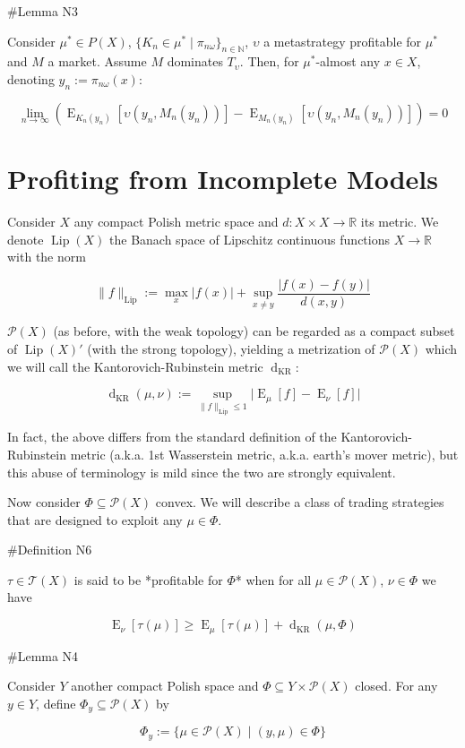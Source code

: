 \documentclass[a4paper]{article}
\DeclareMathOperator{\E}{E}
\newcommand{\Nats}{\mathbb{N}}
\newcommand{\Reals}{\mathbb{R}}
\newcommand{\Abs}[1]{\lvert #1 \rvert}
\newcommand{\Norm}[1]{\lVert #1 \rVert}
\newcommand{\Prob}{\mathcal{P}}
\newcommand{\T}{\mathcal{T}}
\newcommand{\Lip}{\operatorname{Lip}}
\newcommand{\NormL}[1]{\Norm{#1}_{\operatorname{Lip}}}
\newcommand{\Dkr}{\operatorname{d}_{\text{KR}}}
\begin{document}
\#Lemma N3

Consider ${\mu^* \in P(X)}$, ${\{K_n \in \mu^* \mid \pi_{n\omega}\}_{n \in \Nats}}$, ${\upsilon}$ a metastrategy profitable for ${\mu^*}$ and ${M}$ a market. Assume ${M}$ dominates ${T_\upsilon}$. Then, for ${\mu^*}$-almost any ${x \in X}$, denoting ${y_n:=\pi_{n\omega}(x)}$:

$$\lim_{n \rightarrow \infty} (\E_{K_n(y_n)}[\upsilon(y_n,M_n(y_n))]-\E_{M_n(y_n)}[\upsilon(y_n,M_n(y_n))])= 0$$

\section{Profiting from Incomplete Models}

Consider ${X}$ any compact Polish metric space and ${d: X \times X \rightarrow \Reals}$ its metric. We denote ${\Lip(X)}$ the Banach space of Lipschitz continuous functions ${X \rightarrow \Reals}$ with the norm

$$\NormL{f}:=\max_{x} \Abs{f(x)} + \sup_{x \ne y}\frac{\Abs{f(x)-f(y)}}{d(x,y)}$$

${\Prob(X)}$ (as before, with the weak topology) can be regarded as a compact subset of ${\Lip(X)'}$ (with the strong topology), yielding a metrization of ${\Prob(X)}$ which we will call the Kantorovich-Rubinstein metric ${\Dkr}$:

$$\Dkr(\mu,\nu):=\sup_{\NormL{f} \leq 1} \Abs{\E_\mu[f] - \E_\nu[f]}$$

In fact, the above differs from the standard definition of the Kantorovich-Rubinstein metric (a.k.a. 1st Wasserstein metric, a.k.a. earth's mover metric), but this abuse of terminology is mild since the two are strongly equivalent.

Now consider ${\Phi \subseteq \Prob(X)}$ convex. We will describe a class of trading strategies that are designed to exploit any ${\mu \in \Phi}$.

\#Definition N6

${\tau \in \T(X)}$ is said to be *profitable for ${\Phi}$* when for all ${\mu \in \Prob(X)}$, ${\nu \in \Phi}$ we have

$$\E_\nu[\tau(\mu)] \geq \E_\mu[\tau(\mu)] + \Dkr(\mu,\Phi)$$

\#Lemma N4

Consider ${Y}$ another compact Polish space and ${\Phi \subseteq Y \times \Prob(X)}$ closed. For any ${y \in Y}$, define ${\Phi_y \subseteq \Prob(X)}$ by

$${\Phi_y := \{\mu \in \Prob(X) \mid (y,\mu) \in \Phi\}}$$ 
\end{document}
